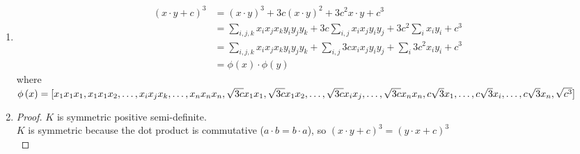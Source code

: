 \documentclass[12pt]{article}
\newcommand{\parens}[1]{\left(#1\right)}
\begin{document}
\begin{enumerate}
\begin{enumerate}
            \item
                \begin{equation}
                    \begin{split}
                        \parens{x\cdot y+c}^3&=\parens{x\cdot y}^3+3c\parens{x\cdot y}^2+
                            3c^2x\cdot y+c^3\\
                        &=\sum_{i,j,k}x_ix_jx_ky_iy_jy_k+3c\sum_{i,j}x_ix_jy_iy_j+
                            3c^2\sum_ix_iy_i+c^3\\
                        &=\sum_{i,j,k}x_ix_jx_ky_iy_jy_k+\sum_{i,j}3cx_ix_jy_iy_j+
                            \sum_i3c^2x_iy_i+c^3\\
                        &=\phi\parens{x}\cdot\phi\parens{y}
                    \end{split}
                \end{equation}
                where $\phi\parens{x}=[x_1x_1x_1,x_1x_1x_2,\ldots,x_ix_jx_k,\ldots,x_nx_nx_n,\\
                    \sqrt{3c}x_1x_1,\sqrt{3c}x_1x_2,\ldots,\sqrt{3c}x_ix_j,\ldots,\sqrt{3c}x_nx_n,\\
                    c\sqrt{3}x_1,\ldots,c\sqrt{3}x_i,\ldots,c\sqrt{3}x_n,\\
                    \sqrt{c^3}]$
            \item
                \begin{proof}$K$ is symmetric positive semi-definite.\\
                    $K$ is symmetric because the dot product is commutative
                    ($a\cdot b=b\cdot a$), so $\parens{x\cdot y+c}^3=\parens{y\cdot x+c}^3$\\


\end{proof}
\end{enumerate}
\end{enumerate}
\end{document}
